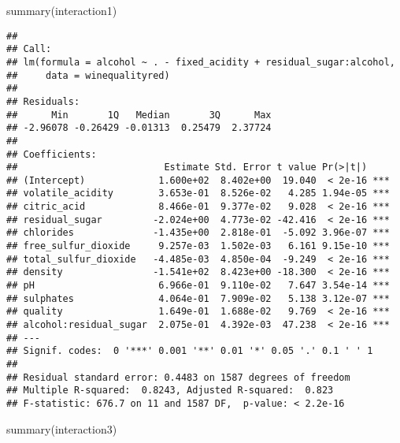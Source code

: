 \documentclass[
]{article}
\newenvironment{Shaded}{\begin{snugshade}}{\end{snugshade}}
\newcommand{\FunctionTok}[1]{\textcolor[rgb]{0.00,0.00,0.00}{#1}}
\newcommand{\NormalTok}[1]{#1}
\begin{document}
\begin{Shaded}
\begin{Highlighting}[]
\FunctionTok{summary}\NormalTok{(interaction1)}
\end{Highlighting}
\end{Shaded}

\begin{verbatim}
## 
## Call:
## lm(formula = alcohol ~ . - fixed_acidity + residual_sugar:alcohol, 
##     data = winequalityred)
## 
## Residuals:
##      Min       1Q   Median       3Q      Max 
## -2.96078 -0.26429 -0.01313  0.25479  2.37724 
## 
## Coefficients:
##                          Estimate Std. Error t value Pr(>|t|)    
## (Intercept)             1.600e+02  8.402e+00  19.040  < 2e-16 ***
## volatile_acidity        3.653e-01  8.526e-02   4.285 1.94e-05 ***
## citric_acid             8.466e-01  9.377e-02   9.028  < 2e-16 ***
## residual_sugar         -2.024e+00  4.773e-02 -42.416  < 2e-16 ***
## chlorides              -1.435e+00  2.818e-01  -5.092 3.96e-07 ***
## free_sulfur_dioxide     9.257e-03  1.502e-03   6.161 9.15e-10 ***
## total_sulfur_dioxide   -4.485e-03  4.850e-04  -9.249  < 2e-16 ***
## density                -1.541e+02  8.423e+00 -18.300  < 2e-16 ***
## pH                      6.966e-01  9.110e-02   7.647 3.54e-14 ***
## sulphates               4.064e-01  7.909e-02   5.138 3.12e-07 ***
## quality                 1.649e-01  1.688e-02   9.769  < 2e-16 ***
## alcohol:residual_sugar  2.075e-01  4.392e-03  47.238  < 2e-16 ***
## ---
## Signif. codes:  0 '***' 0.001 '**' 0.01 '*' 0.05 '.' 0.1 ' ' 1
## 
## Residual standard error: 0.4483 on 1587 degrees of freedom
## Multiple R-squared:  0.8243, Adjusted R-squared:  0.823 
## F-statistic: 676.7 on 11 and 1587 DF,  p-value: < 2.2e-16
\end{verbatim}

\begin{Shaded}
\begin{Highlighting}[]
\FunctionTok{summary}\NormalTok{(interaction3)}
\end{Highlighting}
\end{Shaded}
\end{document}
